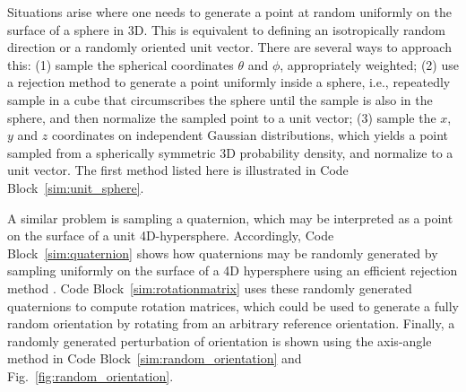 \documentclass[
  9pt,
  bestpractices,
]{livecoms}
\begin{document}
Situations arise where one needs to generate a point at random uniformly on the surface of a sphere in 3D.  This is equivalent to defining an isotropically random direction or a randomly oriented unit vector. There are several ways to approach this: (1) sample the spherical coordinates $\theta$ and $\phi$, appropriately weighted; (2) use a rejection method to generate a point uniformly inside a sphere, i.e., repeatedly sample in a cube that circumscribes the sphere until the sample is also in the sphere, and then normalize the sampled point to a unit vector; (3) sample the $x$, $y$ and $z$ coordinates on independent Gaussian distributions, which yields a point sampled from a spherically symmetric 3D probability density, and normalize to a unit vector. The first method listed here is illustrated in Code Block~\ref{sim:unit_sphere}.

A similar problem is sampling a quaternion, which may be interpreted as a point on the surface of a unit 4D-hypersphere.
Accordingly, Code Block~\ref{sim:quaternion} shows how quaternions may be randomly generated by sampling uniformly on the surface of a 4D hypersphere using an efficient rejection method \cite{vesely_angular_1982}.
Code Block~\ref{sim:rotationmatrix} uses these randomly generated quaternions to compute rotation matrices, which could be used to generate a fully random orientation by rotating from an arbitrary reference orientation.
Finally, a randomly generated perturbation of orientation is shown using the axis-angle method in Code Block~\ref{sim:random_orientation} and Fig.~\ref{fig:random_orientation}.

\begin{figure}

\end{figure}
\end{document}
